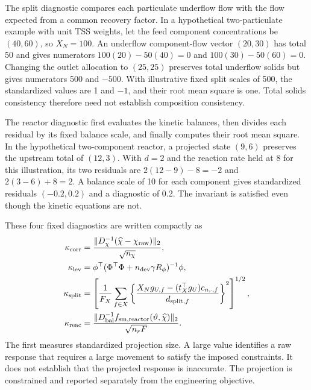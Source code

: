 The split diagnostic compares each particulate underflow flow with the flow expected from a common recovery factor. In a hypothetical two-particulate example with unit TSS weights, let the feed component concentrations be $(40,60)$, so $X_N=100$. An underflow component-flow vector $(20,30)$ has total 50 and gives numerators $100(20)-50(40)=0$ and $100(30)-50(60)=0$. Changing the outlet allocation to $(25,25)$ preserves total underflow solids but gives numerators 500 and $-500$. With illustrative fixed split scales of 500, the standardized values are 1 and $-1$, and their root mean square is one. Total solids consistency therefore need not establish composition consistency.

The reactor diagnostic first evaluates the kinetic balances, then divides each residual by its fixed balance scale, and finally computes their root mean square. In the hypothetical two-component reactor, a projected state $(9,6)$ preserves the upstream total of $(12,3)$. With $d=2$ and the reaction rate held at 8 for this illustration, its two residuals are $2(12-9)-8=-2$ and $2(3-6)+8=2$. A balance scale of 10 for each component gives standardized residuals $(-0.2,0.2)$ and a diagnostic of 0.2. The invariant is satisfied even though the kinetic equations are not.

These four fixed diagnostics are written compactly as
\begin{align}
\equationname{Root-mean-square standardized projection displacement diagnostic}
\kappa_{\rm corr}&=\frac{\|D_\chi^{-1}(\widehat\chi-\chi_{\rm raw})\|_2}{\sqrt{n_\chi}},\\
\equationname{Ridge feature-leverage diagnostic}
\kappa_{\rm lev}&=\phi^\top(\Phi^\top\Phi+n_{\rm dev}\gamma R_\phi)^{-1}\phi,\\
\equationname{Particulate split-consistency diagnostic}
\kappa_{\rm split}&=\left[\frac1{F_X}\sum_{f\in X}
\left\{\frac{X_Ng_{U,f}-(t_X^\top g_U)c_{n_r,f}}{d_{{\rm split},f}}\right\}^2\right]^{1/2},\\
\equationname{Scaled reactor-equation residual diagnostic}
\kappa_{\rm reac}&=\frac{\|D_{\rm bal}^{-1}f_{{\rm sm},\rm reactor}(\vartheta,\widehat\chi)\|_2}{\sqrt{n_rF}}.
\label{eq:plant_trust_diagnostics}
\end{align}
The first measures standardized projection size. A large value identifies a raw response that requires a large movement to satisfy the imposed constraints. It does not establish that the projected response is inaccurate. The projection is constrained and reported separately from the engineering objective.

